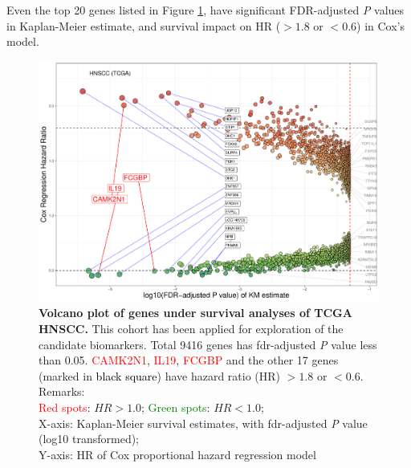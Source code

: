 \documentclass[preprint,12pt]{elsarticle}
\newcommand{\bcaption}[2]{\caption{\textbf{#1} #2}}
\newenvironment{MyColorPar}[1]{%
    \leavevmode\color{#1}\ignorespaces%
}{%
}%
\begin{document}
\begin{MyColorPar}{blue}
Even the top 20 genes listed
in Figure \ref{fig:hazards3}, have significant FDR-adjusted \textit{P} values in Kaplan-Meier estimate, and survival impact on HR ($> 1.8$ or $< 0.6$) in Cox's model. 
\begin{figure}
    \centering
    \includegraphics[width=13cm]{Rplot_TCGA_HNSCC_CoxHR_CAMK2N1_top3FDRKM.pdf}
    \bcaption{Volcano plot of genes under survival analyses of TCGA HNSCC.}{
    This cohort has been applied for exploration of the candidate biomarkers.
    Total 9416 genes has \acrshort{fdr}-adjusted \textit{P} value less than 0.05.
    \textcolor{red}{CAMK2N1}, \textcolor{red}{IL19}, \textcolor{red}{FCGBP} and the other 17 genes (marked in \textcolor{black}{black square}) have hazard ratio (HR) $> 1.8$ or $< 0.6$.\\
    Remarks:\\
    \textcolor{red}{Red spots}: $HR > 1.0$;
    \textcolor{green}{Green spots}: $HR < 1.0$;\\
    X-axis: Kaplan-Meier survival estimates, with \acrshort{fdr}-adjusted \textit{P} value (log10 transformed);\\
    Y-axis: HR of Cox proportional hazard regression model\\
    }
    \label{fig:hazards3}
\end{figure}


\end{MyColorPar}
\end{document}
